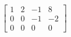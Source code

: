 \documentclass[preview]{standalone}
\begin{document}
\begin{align*}
\left[\begin{array}{ccc|c} 1 & 2 & -1 & 8 \\ 0 & 0 & -1 & -2 \\ 0 & 0 & 0 & 0 \end{array}\right]
\end{align*}
\end{document}
